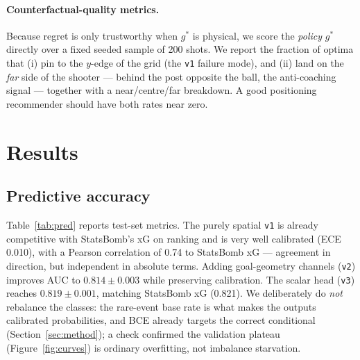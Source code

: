 \documentclass[11pt,a4paper]{article}
\newcommand{\gopt}{g^{*}}
\begin{document}
\paragraph{Counterfactual-quality metrics.}
Because regret is only trustworthy when $\gopt$ is physical, we score the
\emph{policy} $\gopt$ directly over a fixed seeded sample of \num{200} shots. We
report the fraction of optima that (i) pin to the $y$-edge of the grid (the
\texttt{v1} failure mode), and (ii) land on the \emph{far} side of the shooter
--- behind the post opposite the ball, the anti-coaching signal --- together with
a near/centre/far breakdown. A good positioning recommender should have both
rates near zero.

\section{Results}

\subsection{Predictive accuracy}
\label{sec:results-pred}
Table~\ref{tab:pred} reports test-set metrics. The purely spatial \texttt{v1} is
already competitive with StatsBomb's xG on ranking and is very well calibrated
(ECE \num{0.010}), with a Pearson correlation of \num{0.74} to StatsBomb xG ---
agreement in direction, but independent in absolute terms. Adding goal-geometry
channels (\texttt{v2}) improves AUC to $0.814\pm0.003$ while preserving
calibration. The scalar head (\texttt{v3}) reaches $0.819\pm0.001$, matching
StatsBomb xG (\num{0.821}). We deliberately do \emph{not} rebalance the classes:
the rare-event base rate is what makes the outputs calibrated probabilities, and
BCE already targets the correct conditional (Section~\ref{sec:method}); a check
confirmed the validation plateau (Figure~\ref{fig:curves}) is ordinary
overfitting, not imbalance starvation.
\end{document}

